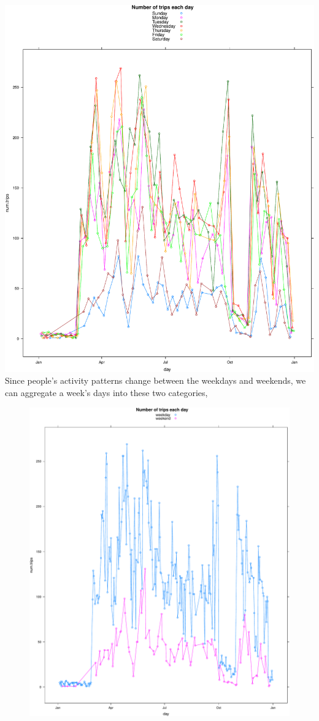 \documentclass[]{article}
\begin{document}
\includegraphics{velopassBirdsEye_files/figure-latex/plottripsbyday-1.pdf}
Since people's activity patterns change between the weekdays and
weekends, we can aggregate a week's days into these two categories,

\begin{figure}[htbp]
\centering
\includegraphics{velopassBirdsEye_files/figure-latex/plottripsweekdayend-1.pdf}
\caption{}
\end{figure}
\end{document}
